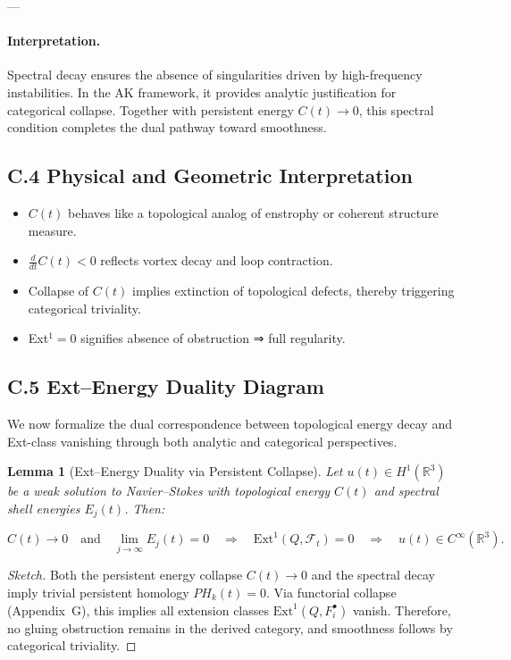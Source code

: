 \documentclass[11pt]{article}
\newtheorem{lemma}[theorem]{Lemma}
\begin{document}
---

\paragraph{Interpretation.}
Spectral decay ensures the absence of singularities driven by high-frequency instabilities.  
In the AK framework, it provides analytic justification for categorical collapse.  
Together with persistent energy \( C(t) \to 0 \), this spectral condition completes the dual pathway toward smoothness.



\subsection*{C.4 Physical and Geometric Interpretation}

\begin{itemize}
  \item $C(t)$ behaves like a topological analog of enstrophy or coherent structure measure.
  \item $\frac{d}{dt} C(t) < 0$ reflects vortex decay and loop contraction.
  \item Collapse of $C(t)$ implies extinction of topological defects, thereby triggering categorical triviality.
  \item Ext$^1 = 0$ signifies absence of obstruction ⇒ full regularity.
\end{itemize}



\subsection*{C.5 Ext–Energy Duality Diagram}

We now formalize the dual correspondence between topological energy decay and Ext-class vanishing through both analytic and categorical perspectives.

\begin{lemma}[Ext–Energy Duality via Persistent Collapse]
Let \( u(t) \in H^1(\mathbb{R}^3) \) be a weak solution to Navier–Stokes with topological energy \( C(t) \) and spectral shell energies \( E_j(t) \). Then:

\[
C(t) \to 0 \quad \text{and} \quad \lim_{j \to \infty} E_j(t) = 0
\quad \Rightarrow \quad
\mathrm{Ext}^1(Q, \mathcal{F}_t) = 0 \quad \Rightarrow \quad u(t) \in C^\infty(\mathbb{R}^3).
\]
\end{lemma}

\begin{proof}[Sketch]
Both the persistent energy collapse \( C(t) \to 0 \) and the spectral decay imply trivial persistent homology \( PH_k(t) = 0 \).  
Via functorial collapse (Appendix~G), this implies all extension classes \( \mathrm{Ext}^1(Q, F_i^\bullet) \) vanish.  
Therefore, no gluing obstruction remains in the derived category, and smoothness follows by categorical triviality.
\end{proof}
\end{document}
